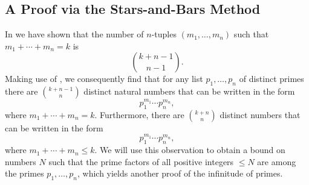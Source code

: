 \subsection{A Proof via the Stars-and-Bars Method}

In  we have shown that the number of $n$-tuples $(m_1,\ldots,m_n)$ such that $m_1+\cdots+m_n=k$ is
\begin{equation*}
  \binom{k+n-1}{n-1}.
\end{equation*}
Making use of , we consequently find that for any list $p_1,\ldots,p_n$ of distinct primes there are $\binom{k+n-1}{n}$ distinct natural numbers that can be written in the form
\begin{equation*}
  p_1^{m_1}\cdots p_n^{m_n},
\end{equation*}
where $m_1+\cdots+m_{n}=k$. Furthermore, there are $\binom{k+n}{n}$ distinct numbers that can be written in the form
\begin{equation*}
  p_1^{m_1}\cdots p_n^{m_n},
\end{equation*}
where $m_1+\cdots+m_{n} \leq k$. We will use this observation to obtain a bound on numbers $N$ such that the prime factors of all positive integers $\leq N$ are among the primes $p_1,\ldots,p_n$, which yields another proof of the infinitude of primes.

